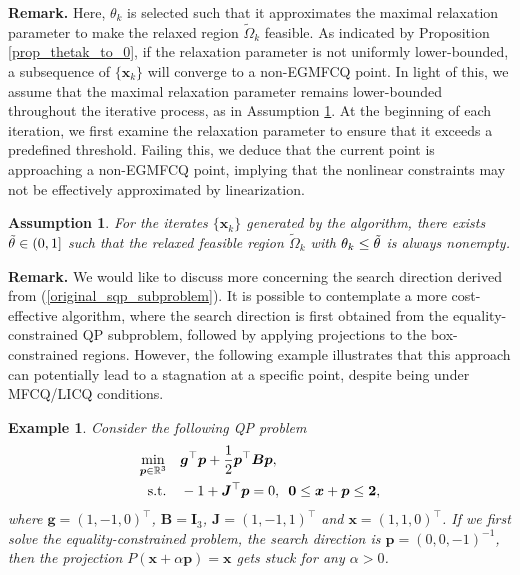 \documentclass[aos]{imsart}
\numberwithin{equation}{section}
\theoremstyle{plain}
\newtheorem{example}{Example}
\newtheorem{assumption}{Assumption}
\begin{document}
\textbf{Remark.} Here, $\theta_k$ is selected such that it approximates the maximal relaxation parameter to make the relaxed region $\widetilde{\Omega}_k$ feasible. As indicated by Proposition \ref{prop_thetak_to_0}, if the relaxation parameter is not uniformly lower-bounded, a subsequence of $\{\bm{x}_k\}$ will converge to a non-EGMFCQ point. In light of this, we assume that the maximal relaxation parameter remains lower-bounded throughout the iterative process, as in Assumption \ref{assump1}. At the beginning of each iteration, we first examine the relaxation parameter to ensure that it exceeds a predefined threshold. Failing this, we deduce that the current point is approaching a non-EGMFCQ point, implying that the nonlinear constraints may not be effectively approximated by linearization.

\begin{assumption}
\label{assump1}
For the iterates $\{\bm{x}_k\}$ generated by the algorithm, there exists $\Tilde{\theta} \in (0,1]$ such that the relaxed feasible region $\widetilde{\Omega}_k$ with $\theta_k \leq \Tilde{\theta}$ is always nonempty.
\end{assumption}


\textbf{Remark.} We would like to discuss more concerning the search direction derived from (\ref{original_sqp_subproblem}). It is possible to contemplate a more cost-effective algorithm, where the search direction is first obtained from the equality-constrained QP subproblem, followed by applying projections to the box-constrained regions. However, the following example illustrates that this approach can potentially lead to a stagnation at a specific point, despite being under MFCQ/LICQ conditions. 
\begin{example}
    Consider the following QP problem
    \begin{equation*}
        \begin{split}
            \min_{\bm{p} \in \mathbb{R}^{3}} & \hspace{1em} \bm{g}^{\top} \bm{p} + \frac{1}{2} \bm{p}^{\top} \bm{B} \bm{p},\\
            \text{s.t.} & \hspace{1em} -1 + \bm{J}^{\top} \bm{p} = 0, \hspace{0.5em} \bm{0} \leq \bm{x} + \bm{p} \leq \bm{2},
        \end{split}
    \end{equation*}
    where $\bm{g} = (1,-1,0)^{\top}$, $\bm{B} = \bm{I}_3$, $\bm{J} = (1,-1,1)^{\top}$ and $\bm{x} = (1, 1, 0)^{\top}$. If we first solve the equality-constrained problem, the search direction is $\bm{p} = (0,0,-1)^{-1}$, then the projection $P(\bm{x}+\alpha \bm{p}) = \bm{x}$ gets stuck for any $\alpha > 0$.
\end{example}
\end{document}
